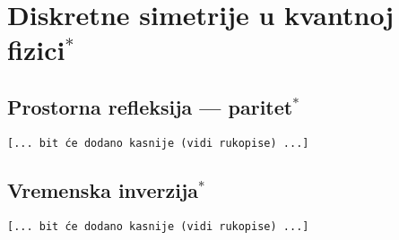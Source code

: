 
\chapter{Diskretne simetrije u kvantnoj fizici$^*$}

\section{Prostorna refleksija --- paritet$^*$}

\texttt{[... bit će dodano kasnije (vidi rukopise) ...]}

\section{Vremenska inverzija$^*$}

\texttt{[... bit će dodano kasnije (vidi rukopise) ...]}

